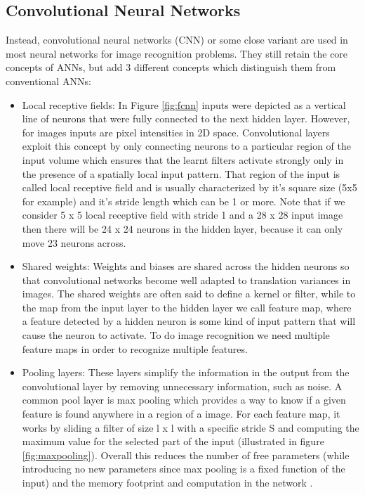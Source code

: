 \subsection{Convolutional Neural Networks}
    Instead, convolutional neural networks (\ac{CNN}) or some close variant are used in most neural networks for image recognition problems\cite{Nielsen2017a}. They still retain the core concepts of \ac{ANN}s, but add 3 different concepts which distinguish them from conventional \ac{ANN}s:
    \begin{itemize}
    \item Local receptive fields: In Figure \ref{fig:fcnn} inputs were depicted as a vertical line of neurons that were fully connected to the next hidden layer. However, for images inputs are pixel intensities in 2D space. Convolutional layers exploit this concept by only connecting neurons to a particular region of the input volume which ensures that the learnt filters activate strongly only in the presence of a spatially local input pattern. That region of the input is called local receptive field and is usually characterized by it's square size (5x5 for example) and it's stride length which can be 1 or more. Note that if we consider 5 x 5  local receptive field with stride 1 and a 28 x 28 input image then there will be 24 x 24  neurons in the hidden layer, because it can only move 23 neurons across.  
    \item Shared weights: Weights and biases are shared across the hidden neurons so that convolutional networks become well adapted to translation variances in images. The shared weights are often said to define a kernel or filter, while to the map from the input layer to the hidden layer we call feature map, where a feature detected by a hidden neuron is some kind of input pattern that will cause the neuron to activate. To do image recognition we need multiple feature maps in order to recognize multiple features.
    \item Pooling layers: These layers simplify the information in the output from the convolutional layer by removing unnecessary information, such as noise. A common pool layer is max pooling which provides a way to know if a given feature is found anywhere in a region of a image. For each feature map, it works by sliding a filter of size l x l with a specific stride S and computing the maximum value for the selected part of the input (illustrated in figure \ref{fig:maxpooling}). Overall this reduces the number of free parameters (while introducing no new parameters since max pooling is a fixed function of the input) and the memory footprint and computation in the network \cite{Nielsen2017a}.

\end{itemize}
